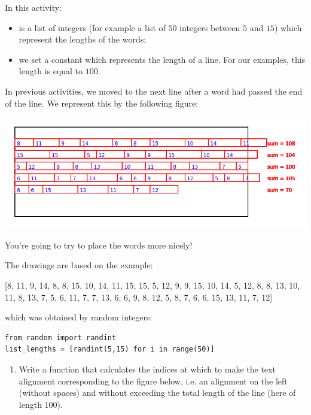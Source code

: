 \documentclass[11pt,class=report,crop=false]{standalone}
\begin{document}
\begin{activite}[Justification]



In this activity:
\begin{itemize}
 \item {} is a list of integers (for example a list of $50$ integers between $5$ and $15$) which represent the lengths of the words;
 \item we set a constant  which represents the length of a line. For our examples, this length is equal to $100$.
 \end{itemize}


In previous activities, we moved to the next line after a word had passed the end of the line.
We represent this by the following figure:
\begin{center}
\includegraphics[scale=0.5]{screen-hyphen-1}
\end{center} 
You're going to try to place the words more nicely!

The drawings are based on the example:
\begin{center}
 [8, 11, 9, 14, 8, 8, 15, 10, 14, 11, 15, 15, 5, 12, 9, 9, 15, 10, 14, 5, 12, 8, 8, 13, 10, 11, 8, 13, 7, 5, 6, 11, 7, 7, 13, 6, 6, 9, 8, 12, 5, 8, 7, 6, 6, 15, 13, 11, 7, 12]
\end{center}
which was obtained by random integers:
\begin{lstlisting}
from random import randint
list_lengths = [randint(5,15) for i in range(50)]
\end{lstlisting}


\begin{enumerate}
  \item Write a  function that calculates the indices at which to make the text alignment corresponding to the figure below, i.e. an alignment on the left (without spaces) and without exceeding the total length of the line (here of length $100$).
  

\end{enumerate}
\end{activite}
\end{document}
